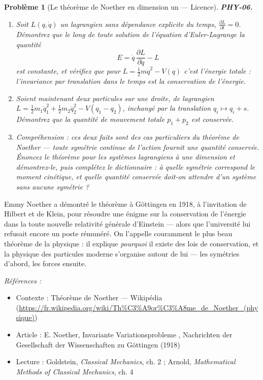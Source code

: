 \documentclass[11pt]{article}
\newtheorem{problem}{Problème}
\newenvironment{refs}{\par\small\noindent\emph{Références :}\begin{itemize}\setlength\itemsep{0pt}}{\end{itemize}\normalsize}
\begin{document}
\begin{problem}[{Le théorème de Noether en dimension un --- Licence}]
\textbf{PHY-06.} \begin{enumerate}
\item[(a)] Soit $L(q, \dot q)$ un lagrangien sans dépendance explicite du temps,
$\frac{\partial L}{\partial t} = 0$. Démontrez que le long de toute solution de l'équation
d'Euler-Lagrange la quantité
\[ E = \dot q\,\frac{\partial L}{\partial \dot q} - L \]
est constante, et vérifiez que pour $L = \tfrac12 m\dot q^2 - V(q)$ c'est l'énergie totale :
l'invariance par translation dans le temps \textit{est} la conservation de l'énergie.
\item[(b)] Soient maintenant deux particules sur une droite, de lagrangien
$L = \tfrac12 m_1\dot q_1^2 + \tfrac12 m_2\dot q_2^2 - V(q_1 - q_2)$, inchangé par la
translation $q_i \mapsto q_i + s$. Démontrez que la quantité de mouvement totale
$p_1 + p_2$ est conservée.
\item[(c)] Compréhension : ces deux faits sont des cas particuliers du théorème de Noether --- toute
symétrie continue de l'action fournit une quantité conservée. Énoncez le théorème pour les
systèmes lagrangiens à une dimension et démontrez-le, puis complétez le dictionnaire : à quelle
symétrie correspond le moment cinétique, et quelle quantité conservée doit-on attendre d'un
système \textit{sans} aucune symétrie ?
\end{enumerate}

\end{problem}

\noindent Emmy Noether a démontré le théorème à Göttingen en 1918, à l'invitation de
Hilbert et de Klein, pour résoudre une énigme sur la conservation de l'énergie dans la toute
nouvelle relativité générale d'Einstein --- alors que l'université lui refusait encore un poste
rémunéré. On l'appelle couramment le plus beau théorème de la physique : il explique
\textit{pourquoi} il existe des lois de conservation, et la physique des particules moderne
s'organise autour de lui --- les symétries d'abord, les forces ensuite.

\begin{refs}
\item Contexte : Théorème de Noether --- Wikipédia (\url{https://fr.wikipedia.org/wiki/Th%C3%A9or%C3%A8me_de_Noether_(physique)})
\item Article : E. Noether, \og{} Invariante Variationsprobleme \fg{}, Nachrichten der Gesellschaft der Wissenschaften zu Göttingen (1918)
\item Lecture : Goldstein, \textit{Classical Mechanics}, ch. 2 ; Arnold, \textit{Mathematical Methods of Classical Mechanics}, ch. 4
\end{refs}
\end{document}
